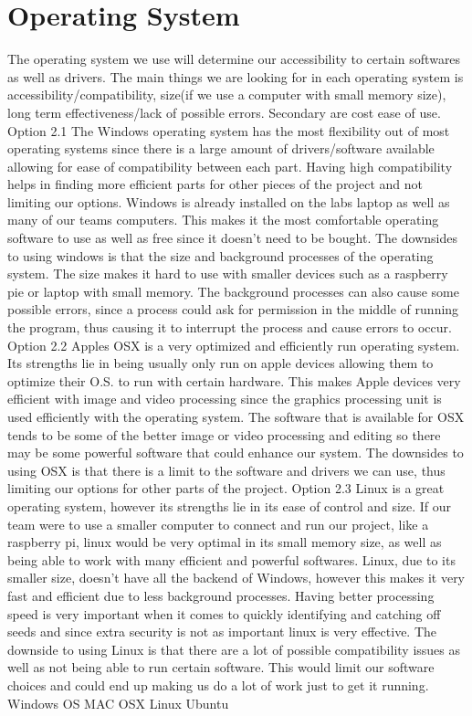 \documentclass[10pt, letterpaper, twoside, draftclsnofoot, onecolumn. notitlepage]{article}
\begin{document}
\section{Operating System}
\quad 
The operating system we use will determine our accessibility to certain softwares as well as drivers. The main things we are looking for in each operating system is accessibility/compatibility, size(if we use a computer with small memory size), long term effectiveness/lack of possible errors. Secondary are cost ease of use. 
Option 2.1 The Windows operating system has the most flexibility out of most operating systems since there is a large amount of drivers/software available allowing for ease of compatibility between each part. Having high compatibility helps in finding more efficient parts for other pieces of the project and not limiting our options. Windows is already installed on the labs laptop as well as many of our teams computers. This makes it the most comfortable operating software to use as well as free since it doesn’t need to be bought. The downsides to using windows is that the size and background processes of the operating system. The size makes it hard to use with smaller devices such as a raspberry pie or laptop with small memory. The background processes can also cause some possible errors, since a process could ask for permission in the middle of running the program, thus causing it to interrupt the process and cause errors to occur. 
Option 2.2 Apples OSX is a very optimized and efficiently run operating system. Its strengths lie in being usually only run on apple devices allowing them to optimize their O.S. to run with certain hardware. This makes Apple devices very efficient with image and video processing since the graphics processing unit is used efficiently with the operating system. The software that is available for OSX tends to be some of the better image or video processing and editing so there may be some powerful software that could enhance our system. The downsides to using OSX is that there is a limit to the software and drivers we can use, thus limiting our options for other parts of the project.
Option 2.3 Linux is a great operating system, however its strengths lie in its ease of control and size. If our team were to use a smaller computer to connect and run our project, like a raspberry pi, linux would be very optimal in its small memory size, as well as being able to work with many efficient and powerful softwares. Linux, due to its smaller size, doesn’t have all the backend of Windows, however this makes it very fast and efficient due to less background processes. Having better processing speed is very important when it comes to quickly identifying and catching off seeds and since extra security is not as important linux is very effective. The downside to using Linux is that there are a lot of possible compatibility issues as well as not being able to run certain software. This would limit our software choices and could end up making us do a lot of work just to get it running.  Windows OS  MAC OSX  Linux Ubuntu \newline
\end{document}

